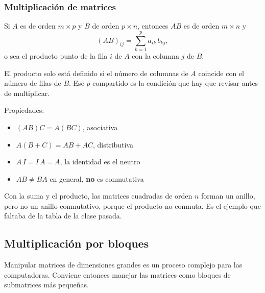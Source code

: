 \documentclass[11pt,letterpaper]{article}
\begin{document}
\subsubsection*{Multiplicación de matrices}

\begin{definicion}
    Si $A$ es de orden $m \times p$ y $B$ de orden $p \times n$,
    entonces $AB$ es de orden $m \times n$ y
    \[
        (AB)_{ij} = \sum_{k=1}^{p} a_{ik}\,b_{kj} ,
    \]
    o sea el producto punto de la fila $i$ de $A$ con la columna $j$
    de $B$.
\end{definicion}

\begin{ojo}
    El producto solo está definido si el número de columnas de $A$
    coincide con el número de filas de $B$. Ese $p$ compartido es la
    condición que hay que revisar antes de multiplicar.
\end{ojo}

Propiedades:

\begin{itemize}[itemsep=0.1em]
    \item $(AB)C = A(BC)$, asociativa
    \item $A(B + C) = AB + AC$, distributiva
    \item $A\,I = I\,A = A$, la identidad es el neutro
    \item $AB \neq BA$ en general, \textbf{no} es conmutativa
\end{itemize}

\begin{idea}
    Con la suma y el producto, las matrices cuadradas de orden $n$
    forman un anillo, pero no un anillo conmutativo, porque el
    producto no conmuta. Es el ejemplo que faltaba de la tabla de la
    clase pasada.
\end{idea}


\subsection*{Multiplicación por bloques}

Manipular matrices de dimensiones grandes es un proceso complejo para
las computadoras. Conviene entonces manejar las matrices como bloques
de submatrices más pequeñas.
\end{document}
